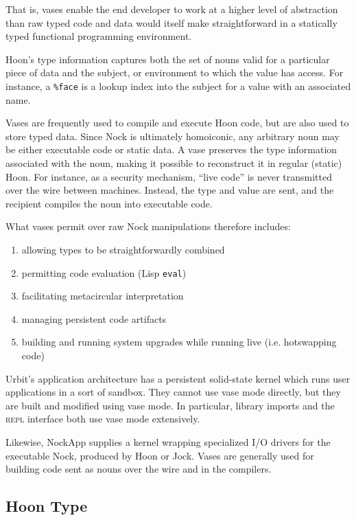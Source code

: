\documentclass[twoside]{article}
\begin{document}
\noindent
That is, vases enable the end developer to work at a higher level of abstraction than raw typed code and data would itself make straightforward in a statically typed functional programming environment.

Hoon's type information captures both the set of nouns valid for a particular piece of data and the subject, or environment to which the value has access.  For instance, a \lstinline[style=inlinecode]{%face} is a lookup index into the subject for a value with an associated name.

Vases are frequently used to compile and execute Hoon code, but are also used to store typed data.  Since Nock is ultimately homoiconic, any arbitrary noun may be either executable code or static data.  A vase preserves the type information associated with the noun, making it possible to reconstruct it in regular (static) Hoon.  For instance, as a security mechanism, “live code” is never transmitted over the wire between machines.  Instead, the type and value are sent, and the recipient compiles the noun into executable code.

What vases permit over raw Nock manipulations therefore includes:

\begin{enumerate}
  \item  allowing types to be straightforwardly combined
  \item  permitting code evaluation (Lisp \lstinline[style=inlinecode]{eval})
  \item  facilitating metacircular interpretation
  \item  managing persistent code artifacts
  \item  building and running system upgrades while running live (i.e. hotswapping code)
\end{enumerate}

\noindent
Urbit's application architecture has a persistent solid-state kernel which runs user applications in a sort of sandbox.  They cannot use vase mode directly, but they are built and modified using vase mode.  In particular, library imports and the \textsc{repl} interface both use vase mode extensively.

Likewise, NockApp supplies a kernel wrapping specialized I/O drivers for the executable Nock, produced by Hoon or Jock.  Vases are generally used for building code sent as nouns over the wire and in the compilers.

\subsection{Hoon Type}
\end{document}
